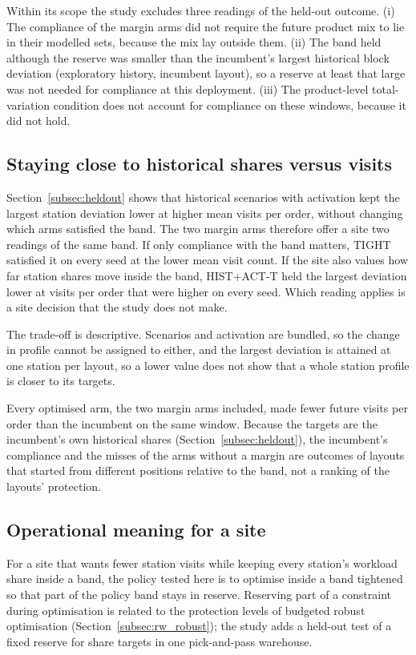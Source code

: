 Within its scope the study excludes three readings of the held-out outcome. (i) The compliance of the margin arms did not require the future product mix to lie in their modelled sets, because the mix lay outside them. (ii) The band held although the reserve was smaller than the incumbent's largest historical block deviation (exploratory history, incumbent layout), so a reserve at least that large was not needed for compliance at this deployment. (iii) The product-level total-variation condition does not account for compliance on these windows, because it did not hold.

\subsection{Staying close to historical shares versus visits}\label{subsec:tradeoff}
Section~\ref{subsec:heldout} shows that historical scenarios with activation kept the largest station deviation lower at higher mean visits per order, without changing which arms satisfied the band. The two margin arms therefore offer a site two readings of the same band. If only compliance with the band matters, TIGHT satisfied it on every seed at the lower mean visit count. If the site also values how far station shares move inside the band, HIST+ACT-T held the largest deviation lower at visits per order that were higher on every seed. Which reading applies is a site decision that the study does not make.

The trade-off is descriptive. Scenarios and activation are bundled, so the change in profile cannot be assigned to either, and the largest deviation is attained at one station per layout, so a lower value does not show that a whole station profile is closer to its targets.

Every optimised arm, the two margin arms included, made fewer future visits per order than the incumbent on the same window. Because the targets are the incumbent's own historical shares (Section~\ref{subsec:heldout}), the incumbent's compliance and the misses of the arms without a margin are outcomes of layouts that started from different positions relative to the band, not a ranking of the layouts' protection.

\subsection{Operational meaning for a site}\label{subsec:operational}
For a site that wants fewer station visits while keeping every station's workload share inside a band, the policy tested here is to optimise inside a band tightened so that part of the policy band stays in reserve. Reserving part of a constraint during optimisation is related to the protection levels of budgeted robust optimisation (Section~\ref{subsec:rw_robust}); the study adds a held-out test of a fixed reserve for share targets in one pick-and-pass warehouse.

